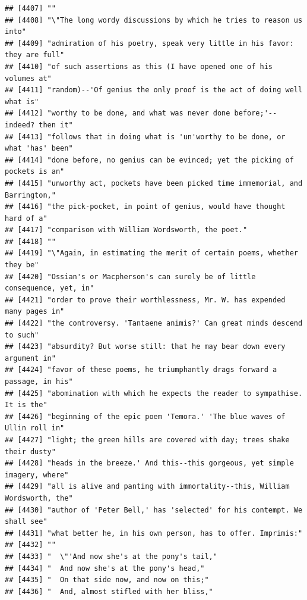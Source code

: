 \documentclass{article}\usepackage[]{graphicx}\usepackage[]{color}
\makeatletter
\newenvironment{kframe}{%
 \def\at@end@of@kframe{}%
 \ifinner\ifhmode%
  \def\at@end@of@kframe{\end{minipage}}%
  \begin{minipage}{\columnwidth}%
 \fi\fi%
 \def\FrameCommand##1{\hskip\@totalleftmargin \hskip-\fboxsep
 \colorbox{shadecolor}{##1}\hskip-\fboxsep
     \hskip-\linewidth \hskip-\@totalleftmargin \hskip\columnwidth}%
 \MakeFramed {\advance\hsize-\width
   \@totalleftmargin\z@ \linewidth\hsize
   \@setminipage}}%
 {\par\unskip\endMakeFramed%
 \at@end@of@kframe}
\newenvironment{knitrout}{}{} %
\makeatother
\begin{document}
\begin{knitrout}
\begin{kframe}
\begin{verbatim}
## [4407] ""                                                                            
## [4408] "\"The long wordy discussions by which he tries to reason us into"            
## [4409] "admiration of his poetry, speak very little in his favor: they are full"     
## [4410] "of such assertions as this (I have opened one of his volumes at"             
## [4411] "random)--'Of genius the only proof is the act of doing well what is"         
## [4412] "worthy to be done, and what was never done before;'--indeed? then it"        
## [4413] "follows that in doing what is 'un'worthy to be done, or what 'has' been"     
## [4414] "done before, no genius can be evinced; yet the picking of pockets is an"     
## [4415] "unworthy act, pockets have been picked time immemorial, and Barrington,"     
## [4416] "the pick-pocket, in point of genius, would have thought hard of a"           
## [4417] "comparison with William Wordsworth, the poet."                               
## [4418] ""                                                                            
## [4419] "\"Again, in estimating the merit of certain poems, whether they be"          
## [4420] "Ossian's or Macpherson's can surely be of little consequence, yet, in"       
## [4421] "order to prove their worthlessness, Mr. W. has expended many pages in"       
## [4422] "the controversy. 'Tantaene animis?' Can great minds descend to such"         
## [4423] "absurdity? But worse still: that he may bear down every argument in"         
## [4424] "favor of these poems, he triumphantly drags forward a passage, in his"       
## [4425] "abomination with which he expects the reader to sympathise. It is the"       
## [4426] "beginning of the epic poem 'Temora.' 'The blue waves of Ullin roll in"       
## [4427] "light; the green hills are covered with day; trees shake their dusty"        
## [4428] "heads in the breeze.' And this--this gorgeous, yet simple imagery, where"    
## [4429] "all is alive and panting with immortality--this, William Wordsworth, the"    
## [4430] "author of 'Peter Bell,' has 'selected' for his contempt. We shall see"       
## [4431] "what better he, in his own person, has to offer. Imprimis:"                  
## [4432] ""                                                                            
## [4433] "  \"'And now she's at the pony's tail,"                                      
## [4434] "  And now she's at the pony's head,"                                         
## [4435] "  On that side now, and now on this;"                                        
## [4436] "  And, almost stifled with her bliss,"                                       

\end{verbatim}
\end{kframe}
\end{knitrout}
\end{document}
